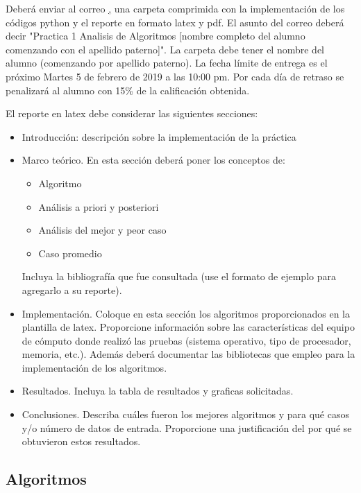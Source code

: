 \documentclass[conference]{IEEEtran}
\begin{document}
Deber\'a enviar al correo \href{miriam.pescador@gmail.com}, una carpeta comprimida con la implementaci\'on de los c\'odigos python y el reporte en formato latex y pdf.
El asunto del correo deber\'a decir "Practica 1 Analisis de Algoritmos [nombre completo del alumno comenzando con el apellido paterno]".
La carpeta debe tener el nombre del alumno (comenzando por apellido paterno).
La fecha l\'imite de entrega es el pr\'oximo Martes 5 de febrero de 2019 a las 10:00 pm. Por cada d\'ia de retraso se penalizar\'a al alumno con 15\% de la calificaci\'on obtenida. 

El reporte en latex debe considerar las siguientes secciones:

\begin{itemize}
\item Introducci\'on: descripci\'on sobre la implementaci\'on de la pr\'actica
\item Marco te\'orico. En esta secci\'on deber\'a poner los conceptos de:
\begin{itemize}
	\item Algoritmo
	\item An\'alisis a priori y posteriori
	\item An\'alisis del mejor y peor caso
	\item Caso promedio
\end{itemize}
Incluya la bibliograf\'ia que fue consultada (use el formato de ejemplo para agregarlo a su reporte).
\item Implementaci\'on. Coloque en esta secci\'on los algoritmos proporcionados en la plantilla de latex. Proporcione informaci\'on sobre las caracter\'isticas del equipo de c\'omputo donde realiz\'o las pruebas (sistema operativo, tipo de procesador, memoria, etc.).
Adem\'as deber\'a documentar las bibliotecas que empleo para la implementaci\'on de los algoritmos.
\item Resultados. Incluya la tabla de resultados y graficas solicitadas.
\item Conclusiones. Describa cu\'ales fueron los mejores algoritmos y para qu\'e casos y/o n\'umero de datos de entrada. Proporcione una justificaci\'on del por qu\'e se obtuvieron estos resultados. 
\end{itemize} 

\subsection{Algoritmos}
\end{document}
